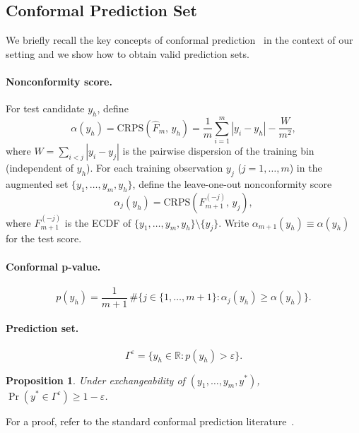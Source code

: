 \documentclass[11pt]{article}
\newtheorem{proposition}{Proposition}
\begin{document}
\subsection{Conformal Prediction Set}
\label{sec:conformal-set}

We briefly recall the key concepts of conformal prediction~\citep{VovkEtAl2022} 
in the context of our setting and we show how to obtain valid prediction sets.

\paragraph{Nonconformity score.}
For test candidate $y_h$, define
\[
  \alpha(y_h) = \mathrm{CRPS}(\hat{F}_m,\, y_h)
  = \frac{1}{m}\sum_{i=1}^m |y_i - y_h| - \frac{W}{m^2},
\]
where $W = \sum_{i<j}|y_i - y_j|$ is the pairwise dispersion of the training bin
(independent of $y_h$).
For each training observation $y_j$ ($j = 1,\ldots,m$) in the augmented set
$\{y_1,\ldots,y_m,y_h\}$, define the leave-one-out nonconformity score
\[
  \alpha_j(y_h) = \mathrm{CRPS}(F^{(-j)}_{m+1},\, y_j),
\]
where $F^{(-j)}_{m+1}$ is the ECDF of $\{y_1,\ldots,y_m,y_h\}\setminus\{y_j\}$.
Write $\alpha_{m+1}(y_h) \equiv \alpha(y_h)$ for the test score.

\paragraph{Conformal p-value.}
\[
  p(y_h) = \frac{1}{m+1}\,\#\bigl\{j \in \{1,\ldots,m+1\} :
  \alpha_j(y_h) \ge \alpha(y_h)\bigr\}.
\]

\paragraph{Prediction set.}
\[
  \Gamma^\varepsilon = \{y_h \in \mathbb{R} : p(y_h) > \varepsilon\}.
\]

\begin{proposition}
\label{prop:coverage}
Under exchangeability of $(y_1,\ldots,y_m,y^*)$,\; $\Pr(y^* \in \Gamma^\varepsilon) \ge 1-\varepsilon$.
\end{proposition}

For a proof, refer to the standard conformal prediction literature~\citep{VovkEtAl2022}.

\end{document}
